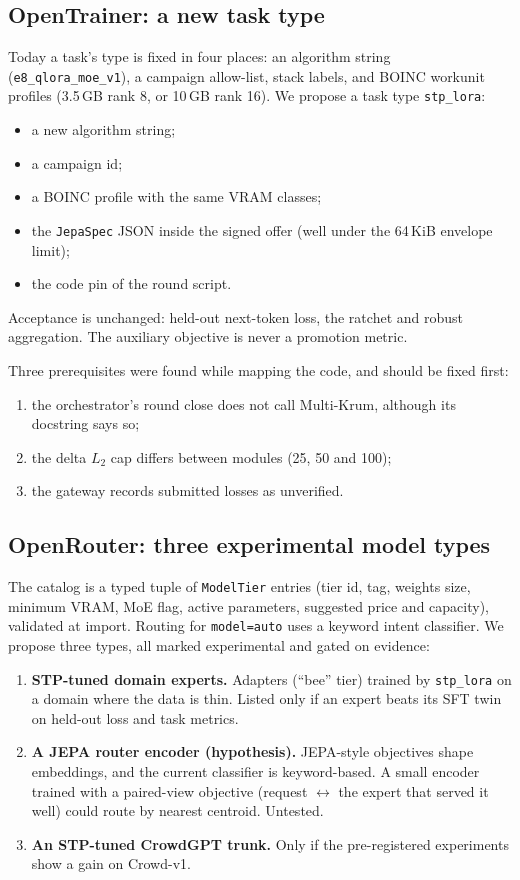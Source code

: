 \documentclass[11pt]{article}
\begin{document}
\subsection{OpenTrainer: a new task type}
Today a task's type is fixed in four places: an algorithm string (\texttt{e8\_qlora\_moe\_v1}), a campaign allow-list,
stack labels, and BOINC workunit profiles (3.5\,GB rank 8, or 10\,GB rank 16). We propose a task type
\texttt{stp\_lora}:
\begin{itemize}
\item a new algorithm string;
\item a campaign id;
\item a BOINC profile with the same VRAM classes;
\item the \texttt{JepaSpec} JSON inside the signed offer (well under the 64\,KiB envelope limit);
\item the code pin of the round script.
\end{itemize}
Acceptance is unchanged: held-out next-token loss, the ratchet and robust aggregation. The auxiliary objective is never
a promotion metric.

Three prerequisites were found while mapping the code, and should be fixed first:
\begin{enumerate}
\item the orchestrator's round close does not call Multi-Krum, although its docstring says so;
\item the delta $L_2$ cap differs between modules (25, 50 and 100);
\item the gateway records submitted losses as unverified.
\end{enumerate}

\subsection{OpenRouter: three experimental model types}
The catalog is a typed tuple of \texttt{ModelTier} entries (tier id, tag, weights size, minimum VRAM, MoE flag, active
parameters, suggested price and capacity), validated at import. Routing for \texttt{model=auto} uses a keyword intent
classifier. We propose three types, all marked experimental and gated on evidence:
\begin{enumerate}
\item \textbf{STP-tuned domain experts.} Adapters (``bee'' tier) trained by \texttt{stp\_lora} on a domain where the
data is thin. Listed only if an expert beats its SFT twin on held-out loss and task metrics.
\item \textbf{A JEPA router encoder (hypothesis).} JEPA-style objectives shape embeddings, and the current classifier
is keyword-based. A small encoder trained with a paired-view objective (request $\leftrightarrow$ the expert that served
it well) could route by nearest centroid. Untested.
\item \textbf{An STP-tuned CrowdGPT trunk.} Only if the pre-registered experiments show a gain on Crowd-v1.
\end{enumerate}
\end{document}
